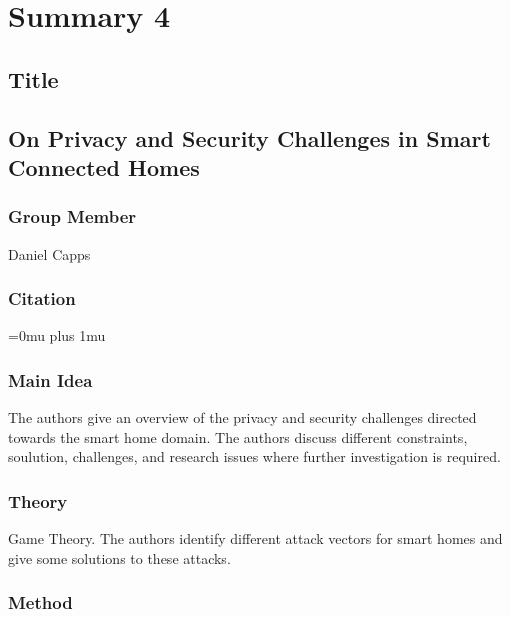 \section{Summary 4}

\noindent
\subsection{Title}

\subsection{{O}n {P}rivacy and {S}ecurity {C}hallenges in {S}mart {C}onnected {H}omes}

\subsubsection{Group Member}

\noindent
Daniel Capps

\noindent
\subsubsection{Citation}

\Urlmuskip=0mu plus 1mu\relax


\subsubsection{Main Idea}

\noindent
The authors give an overview of the privacy and security challenges directed towards the smart home domain. The authors discuss different constraints, soulution, challenges, and research issues where further investigation is required.




\subsubsection{Theory}

\noindent
Game Theory. The authors identify different attack vectors for smart homes and give some solutions to these attacks.



\subsubsection{Method}

